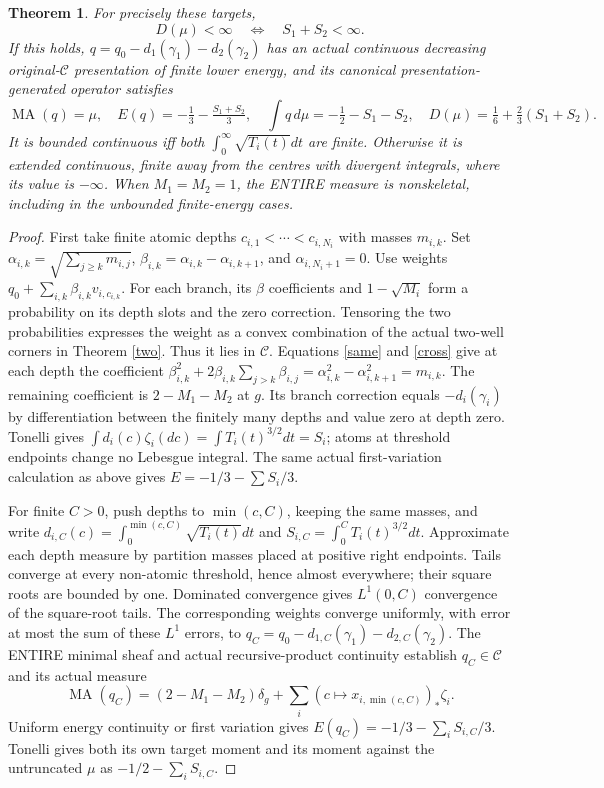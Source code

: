 \documentclass[11pt]{article}
\newtheorem{theorem}{Theorem}
\newcommand{\MA}{\operatorname{MA}}
\newcommand{\C}{\mathcal C}
\begin{document}
\begin{theorem}\label{radon}
For precisely these targets,
\[
 D(\mu)<\infty\quad\Longleftrightarrow\quad S_1+S_2<\infty.
\]
If this holds, $q=q_0-d_1(\gamma_1)-d_2(\gamma_2)$ has an actual
continuous decreasing original-$\C$ presentation of finite lower energy,
and its canonical presentation-generated operator satisfies
\[
 \MA(q)=\mu,\quad E(q)=-\tfrac13-\tfrac{S_1+S_2}3,
 \quad\int q\,d\mu=-\tfrac12-S_1-S_2,
 \quad D(\mu)=\tfrac16+\tfrac23(S_1+S_2).
\]
It is bounded continuous iff both $\int_0^\infty\sqrt{T_i(t)}dt$ are
finite. Otherwise it is extended continuous, finite away from the centres
with divergent integrals, where its value is $-\infty$.
When $M_1=M_2=1$, the ENTIRE measure is nonskeletal, including in the
unbounded finite-energy cases.
\end{theorem}
\begin{proof}
First take finite atomic depths $c_{i,1}<\cdots<c_{i,N_i}$ with masses
$m_{i,k}$. Set
$\alpha_{i,k}=\sqrt{\sum_{j\ge k}m_{i,j}}$,
$\beta_{i,k}=\alpha_{i,k}-\alpha_{i,k+1}$, and $\alpha_{i,N_i+1}=0$.
Use weights $q_0+\sum_{i,k}\beta_{i,k}v_{i,c_{i,k}}$.
For each branch, its $\beta$ coefficients and $1-\sqrt{M_i}$ form a
probability on its depth slots and the zero correction. Tensoring the
two probabilities expresses the weight as a convex combination of the
actual two-well corners in Theorem \ref{two}. Thus it lies in $\C$.
Equations \eqref{same} and \eqref{cross} give at each depth the coefficient
$\beta_{i,k}^2+2\beta_{i,k}\sum_{j>k}\beta_{i,j}
=\alpha_{i,k}^2-\alpha_{i,k+1}^2=m_{i,k}$.
The remaining coefficient is $2-M_1-M_2$ at $g$.
Its branch correction equals $-d_i(\gamma_i)$ by differentiation between
the finitely many depths and value zero at depth zero. Tonelli gives
$\int d_i(c)\zeta_i(dc)=\int T_i(t)^{3/2}dt=S_i$;
atoms at threshold endpoints change no Lebesgue integral. The same actual
first-variation calculation as above gives $E=-1/3-\sum S_i/3$.

For finite $C>0$, push depths to $\min(c,C)$, keeping the same masses,
and write $d_{i,C}(c)=\int_0^{\min(c,C)}\sqrt{T_i(t)}dt$ and
$S_{i,C}=\int_0^C T_i(t)^{3/2}dt$.
Approximate each depth measure by partition masses placed at positive
right endpoints. Tails converge at every non-atomic threshold, hence
almost everywhere; their square roots are bounded by one. Dominated
convergence gives $L^1(0,C)$ convergence of the square-root tails.
The corresponding weights converge uniformly, with error at most the
sum of these $L^1$ errors, to
$q_C=q_0-d_{1,C}(\gamma_1)-d_{2,C}(\gamma_2)$.
The ENTIRE minimal sheaf and actual recursive-product continuity establish
$q_C\in\C$ and its actual measure
\[
 \MA(q_C)=(2-M_1-M_2)\delta_g
       +\sum_i(c\mapsto x_{i,\min(c,C)})_*\zeta_i.
\]
Uniform energy continuity or first variation gives
$E(q_C)=-1/3-\sum_iS_{i,C}/3$. Tonelli gives both its own target moment
and its moment against the untruncated $\mu$ as $-1/2-\sum_iS_{i,C}$.


\end{proof}
\end{document}
